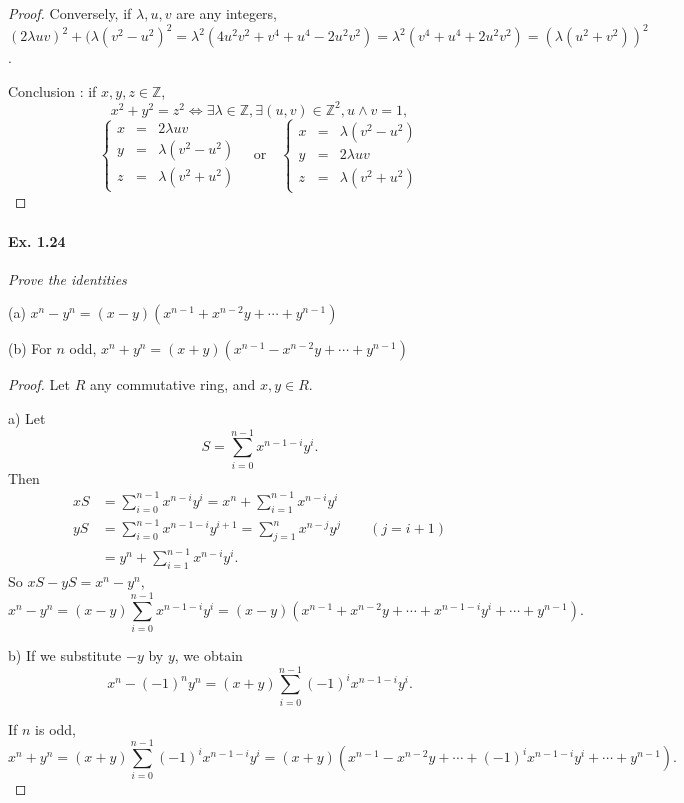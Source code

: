 \documentclass[11pt,a4paper]{article}
\newcommand{\Z}{\mathbb{Z}}
\begin{document}
{\begin{proof}
Conversely, if $\lambda, u, v$ are any integers, $(2\lambda uv)^2 + (\lambda(v^2-u^2)^2 = \lambda^2 (4 u^2v^2 + v^4 + u^4 -2 u^2v^2) = \lambda^2 ( v^4 + u^4 +2 u^2v^2) = (\lambda (u^2+v^2))^2$.

Conclusion : if $x,y,z \in \Z$,
$$
x^2+y^2 = z^2 \iff \exists \lambda \in \Z, \exists (u,v) \in \Z^2, u\wedge v = 1,$$
$$
\left\{
\begin{array}{ccc}
 x  & =   &2 \lambda uv  \\
  y & = &\lambda(v^2 - u^2)     \\
  z&  = & \lambda (v^2+u^2)  
\end{array}
\right.
\quad \mathrm{or}\quad \left\{
\begin{array}{ccc}
 x  & =   &\lambda(v^2 - u^2)  \\
  y & = &   2 \lambda uv  \\
  z&  = & \lambda (v^2+u^2)  
\end{array}
\right.
$$
\end{proof}

\paragraph{Ex. 1.24}

{\it Prove the identities

(a) $x^n - y^n = (x-y) (x^{n-1}+x^{n-2} y + \cdots +y^{n-1})$

(b) For $n$ odd, $x^n + y^n = (x+y) (x^{n-1}- x^{n-2} y + \cdots +y^{n-1})$
}

\begin{proof}
Let $R$ any commutative ring, and $x,y \in R$.

a) Let $$S = \sum_{i=0}^{n-1} x^{n-1-i} y^i.$$ Then
\begin{align*}
xS &= \sum_{i=0}^{n-1} x^{n-i} y^i = x^n + \sum_{i=1}^{n-1} x^{n-i} y^i\\
yS &= \sum_{i=0}^{n-1} x^{n-1-i} y^{i+1} = \sum_{j=1}^{n} x^{n-j} y^j \qquad(j = i+1)\\
&=y^n + \sum_{i=1}^{n-1} x^{n-i} y^i.
\end{align*}
So $xS - y S = x^n-y^n$,
$$x^n - y^n = (x-y) \sum_{i=0}^{n-1} x^{n-1-i} y^i = (x-y)(x^{n-1}+x^{n-2} y + \cdots +x^{n-1-i}y^i+ \cdots + y^{n-1}).$$

b) If we substitute $-y$ by $y$, we obtain
$$x^n - (-1)^n y^n = (x+ y) \sum_{i=0}^{n-1}(-1)^i x^{n-1-i} y^i .$$

If $n$ is odd,
$$x^n  + y^n = (x+ y) \sum_{i=0}^{n-1}(-1)^i x^{n-1-i} y^i  = (x+y)(x^{n-1}-x^{n-2} y + \cdots +(-1)^i x^{n-1-i}y^i+ \cdots + y^{n-1}).$$
\end{proof}

}
\end{document}
